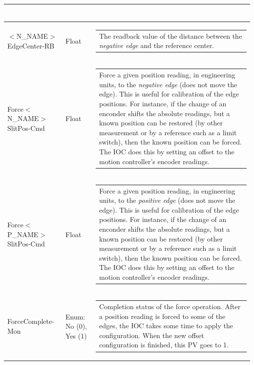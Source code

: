 \documentclass[openany]{article}
\begin{document}
\begin{longtable}{| m{4.5cm} m{2.5cm}  m{7.0cm} |}
\begin{tabular}{@{}m{6cm}@{}}
            \end{tabular} \hypertarget{}{}\\ \hline
        $<$N\_NAME$>$EdgeCenter-RB & Float & \begin{tabular}{@{}m{6cm}@{}}
                The readback value of the distance between the \emph{negative edge} and the reference center.
            \end{tabular} \hypertarget{pv:force-negative-edge-pos-cmd}{}\\ \hline
        Force$<$N\_NAME$>$SlitPos-Cmd & Float & \begin{tabular}{@{}m{6cm}@{}}
                Force a given position reading, in engineering units, to the \emph{negative edge} (does not move the edge). This is useful for calibration of the edge positions. For instance, if the change of an enconder shifts the absolute readings, but a known position can be restored (by other measurement or by a reference such as a limit switch), then the known position can be forced. The IOC does this by setting an offset to the motion controller's encoder readings.
            \end{tabular} \hypertarget{pv:force-positive-edge-pos-cmd}{}\\ \hline
        Force$<$P\_NAME$>$SlitPos-Cmd & Float & \begin{tabular}{@{}m{6cm}@{}}
                Force a given position reading, in engineering units, to the \emph{positive edge} (does not move the edge). This is useful for calibration of the edge positions. For instance, if the change of an enconder shifts the absolute readings, but a known position can be restored (by other measurement or by a reference such as a limit switch), then the known position can be forced. The IOC does this by setting an offset to the motion controller's encoder readings.
            \end{tabular} \hypertarget{pv:force-complete-mon}{}\\ \hline
        ForceComplete-Mon & Enum: No (0), Yes (1) & \begin{tabular}{@{}m{6cm}@{}}
                Completion status of the force operation. After a position reading is forced to some of the edges, the IOC takes some time to apply the configuration. When the new offset configuration is finished, this PV goes to 1.
            \end{tabular} \hypertarget{pv:home-cmd}{}\\ \hline

\end{longtable}
\end{document}
